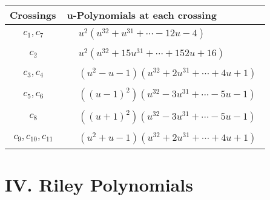 \documentclass[1p]{elsarticle_modified}
\theoremstyle{definition}
\begin{document}
\begin{tabular}{m{50pt}|m{274pt}}
Crossings & \hspace{64pt}u-Polynomials at each crossing \\
\hline $$\begin{aligned}c_{1},c_{7}\end{aligned}$$&$\begin{aligned}
&u^2(u^{32}+u^{31}+\cdots-12 u-4)
\end{aligned}$\\
\hline $$\begin{aligned}c_{2}\end{aligned}$$&$\begin{aligned}
&u^2(u^{32}+15 u^{31}+\cdots+152 u+16)
\end{aligned}$\\
\hline $$\begin{aligned}c_{3},c_{4}\end{aligned}$$&$\begin{aligned}
&(u^2- u-1)(u^{32}+2 u^{31}+\cdots+4 u+1)
\end{aligned}$\\
\hline $$\begin{aligned}c_{5},c_{6}\end{aligned}$$&$\begin{aligned}
&((u-1)^2)(u^{32}-3 u^{31}+\cdots-5 u-1)
\end{aligned}$\\
\hline $$\begin{aligned}c_{8}\end{aligned}$$&$\begin{aligned}
&((u+1)^2)(u^{32}-3 u^{31}+\cdots-5 u-1)
\end{aligned}$\\
\hline $$\begin{aligned}c_{9},c_{10},c_{11}\end{aligned}$$&$\begin{aligned}
&(u^2+u-1)(u^{32}+2 u^{31}+\cdots+4 u+1)
\end{aligned}$\\
\hline
\end{tabular}\newpage\renewcommand{\arraystretch}{1}
\centering \section*{ IV. Riley Polynomials}
\end{document}

